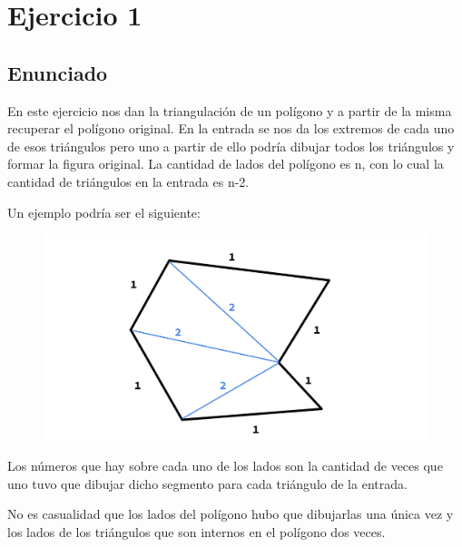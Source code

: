 \section{Ejercicio 1}

\subsection{Enunciado}

En este ejercicio nos dan la triangulación de un polígono y a partir de la misma recuperar el polígono original. En la entrada se nos da los extremos de cada uno de esos triángulos pero uno a partir de ello podría dibujar todos los triángulos y formar la figura original. La cantidad de lados del polígono es n, con lo cual la cantidad de triángulos en la entrada es n-2.\newline

Un ejemplo podría ser el siguiente:\newline

\begin{figure}[h!]
	\centering
	\includegraphics[scale = 0.25]{img/poligono-triangulado.png}
\end{figure}

Los números que hay sobre cada uno de los lados son la cantidad de veces que uno tuvo que dibujar dicho segmento para cada triángulo de la entrada.\newline

No es casualidad que los lados del polígono hubo que dibujarlas una única vez y los lados de los triángulos que son internos en el polígono dos veces.\newline

